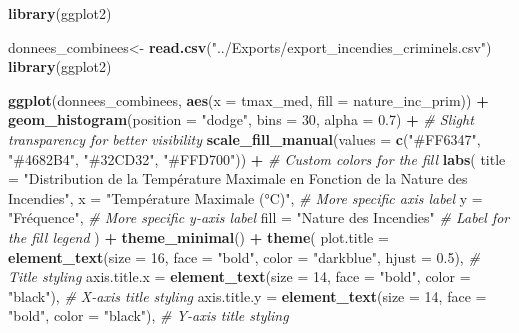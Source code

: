 \documentclass[
]{article}
\newenvironment{Shaded}{\begin{snugshade}}{\end{snugshade}}
\newcommand{\AttributeTok}[1]{\textcolor[rgb]{0.13,0.29,0.53}{#1}}
\newcommand{\CommentTok}[1]{\textcolor[rgb]{0.56,0.35,0.01}{\textit{#1}}}
\newcommand{\DecValTok}[1]{\textcolor[rgb]{0.00,0.00,0.81}{#1}}
\newcommand{\FloatTok}[1]{\textcolor[rgb]{0.00,0.00,0.81}{#1}}
\newcommand{\FunctionTok}[1]{\textcolor[rgb]{0.13,0.29,0.53}{\textbf{#1}}}
\newcommand{\NormalTok}[1]{#1}
\newcommand{\OtherTok}[1]{\textcolor[rgb]{0.56,0.35,0.01}{#1}}
\newcommand{\SpecialCharTok}[1]{\textcolor[rgb]{0.81,0.36,0.00}{\textbf{#1}}}
\newcommand{\StringTok}[1]{\textcolor[rgb]{0.31,0.60,0.02}{#1}}
\begin{document}
\begin{Shaded}
\begin{Highlighting}[]
  \FunctionTok{library}\NormalTok{(ggplot2)}
  
\NormalTok{  donnees\_combinees}\OtherTok{\textless{}{-}} \FunctionTok{read.csv}\NormalTok{(}\StringTok{"../Exports/export\_incendies\_criminels.csv"}\NormalTok{)}
  \FunctionTok{library}\NormalTok{(ggplot2)}
  
  \FunctionTok{ggplot}\NormalTok{(donnees\_combinees, }\FunctionTok{aes}\NormalTok{(}\AttributeTok{x =}\NormalTok{ tmax\_med, }\AttributeTok{fill =}\NormalTok{ nature\_inc\_prim)) }\SpecialCharTok{+}
    \FunctionTok{geom\_histogram}\NormalTok{(}\AttributeTok{position =} \StringTok{"dodge"}\NormalTok{, }\AttributeTok{bins =} \DecValTok{30}\NormalTok{, }\AttributeTok{alpha =} \FloatTok{0.7}\NormalTok{) }\SpecialCharTok{+}  \CommentTok{\# Slight transparency for better visibility}
    \FunctionTok{scale\_fill\_manual}\NormalTok{(}\AttributeTok{values =} \FunctionTok{c}\NormalTok{(}\StringTok{"\#FF6347"}\NormalTok{, }\StringTok{"\#4682B4"}\NormalTok{, }\StringTok{"\#32CD32"}\NormalTok{, }\StringTok{"\#FFD700"}\NormalTok{)) }\SpecialCharTok{+}  \CommentTok{\# Custom colors for the fill}
    \FunctionTok{labs}\NormalTok{(}
      \AttributeTok{title =} \StringTok{"Distribution de la Température Maximale en Fonction de la Nature des Incendies"}\NormalTok{,}
      \AttributeTok{x =} \StringTok{"Température Maximale (°C)"}\NormalTok{,  }\CommentTok{\# More specific axis label}
      \AttributeTok{y =} \StringTok{"Fréquence"}\NormalTok{,  }\CommentTok{\# More specific y{-}axis label}
      \AttributeTok{fill =} \StringTok{"Nature des Incendies"}  \CommentTok{\# Label for the fill legend}
\NormalTok{    ) }\SpecialCharTok{+}
    \FunctionTok{theme\_minimal}\NormalTok{() }\SpecialCharTok{+}  
    \FunctionTok{theme}\NormalTok{(}
      \AttributeTok{plot.title =} \FunctionTok{element\_text}\NormalTok{(}\AttributeTok{size =} \DecValTok{16}\NormalTok{, }\AttributeTok{face =} \StringTok{"bold"}\NormalTok{, }\AttributeTok{color =} \StringTok{"darkblue"}\NormalTok{, }\AttributeTok{hjust =} \FloatTok{0.5}\NormalTok{),  }\CommentTok{\# Title styling}
      \AttributeTok{axis.title.x =} \FunctionTok{element\_text}\NormalTok{(}\AttributeTok{size =} \DecValTok{14}\NormalTok{, }\AttributeTok{face =} \StringTok{"bold"}\NormalTok{, }\AttributeTok{color =} \StringTok{"black"}\NormalTok{),  }\CommentTok{\# X{-}axis title styling}
      \AttributeTok{axis.title.y =} \FunctionTok{element\_text}\NormalTok{(}\AttributeTok{size =} \DecValTok{14}\NormalTok{, }\AttributeTok{face =} \StringTok{"bold"}\NormalTok{, }\AttributeTok{color =} \StringTok{"black"}\NormalTok{),  }\CommentTok{\# Y{-}axis title styling}

\end{Highlighting}
\end{Shaded}
\end{document}
